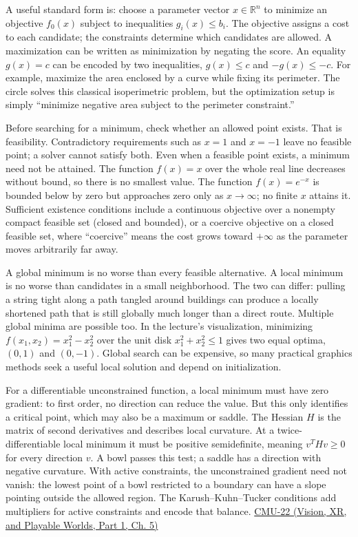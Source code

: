 \hypertarget{04-visual-computing-ii-ch029-feasible-sets-existence-and-the-difference-between-local-and-global}{}

A useful standard form is: choose a parameter vector \(x\in\mathbb R^n\) to minimize an objective \(f_0(x)\) subject to inequalities \(g_i(x)\le b_i\). The objective assigns a cost to each candidate; the constraints determine which candidates are allowed. A maximization can be written as minimization by negating the score. An equality \(g(x)=c\) can be encoded by two inequalities, \(g(x)\le c\) and \(-g(x)\le -c\). For example, maximize the area enclosed by a curve while fixing its perimeter. The circle solves this classical isoperimetric problem, but the optimization setup is simply ``minimize negative area subject to the perimeter constraint.''

Before searching for a minimum, check whether an allowed point exists. That is feasibility. Contradictory requirements such as \(x=1\) and \(x=-1\) leave no feasible point; a solver cannot satisfy both. Even when a feasible point exists, a minimum need not be attained. The function \(f(x)=x\) over the whole real line decreases without bound, so there is no smallest value. The function \(f(x)=e^{-x}\) is bounded below by zero but approaches zero only as \(x\to\infty\); no finite \(x\) attains it. Sufficient existence conditions include a continuous objective over a nonempty compact feasible set (closed and bounded), or a coercive objective on a closed feasible set, where ``coercive'' means the cost grows toward \(+\infty\) as the parameter moves arbitrarily far away.

A global minimum is no worse than every feasible alternative. A local minimum is no worse than candidates in a small neighborhood. The two can differ: pulling a string tight along a path tangled around buildings can produce a locally shortened path that is still globally much longer than a direct route. Multiple global minima are possible too. In the lecture's visualization, minimizing \(f(x_1,x_2)=x_1^2-x_2^2\) over the unit disk \(x_1^2+x_2^2\le1\) gives two equal optima, \((0,1)\) and \((0,-1)\). Global search can be expensive, so many practical graphics methods seek a useful local solution and depend on initialization.

For a differentiable unconstrained function, a local minimum must have zero gradient: to first order, no direction can reduce the value. But this only identifies a critical point, which may also be a maximum or saddle. The Hessian \(H\) is the matrix of second derivatives and describes local curvature. At a twice-differentiable local minimum it must be positive semidefinite, meaning \(v^T H v\ge0\) for every direction \(v\). A bowl passes this test; a saddle has a direction with negative curvature. With active constraints, the unconstrained gradient need not vanish: the lowest point of a bowl restricted to a boundary can have a slope pointing outside the allowed region. The Karush--Kuhn--Tucker conditions add multipliers for active constraints and encode that balance. \href{../07-Vision-XR-and-Playable-Worlds-P01/main.pdf\#nameddest=04-visual-computing-ii-ch036-cmu-22---optimization}{CMU-22 (Vision, XR, and Playable Worlds, Part 1, Ch. 5)}

